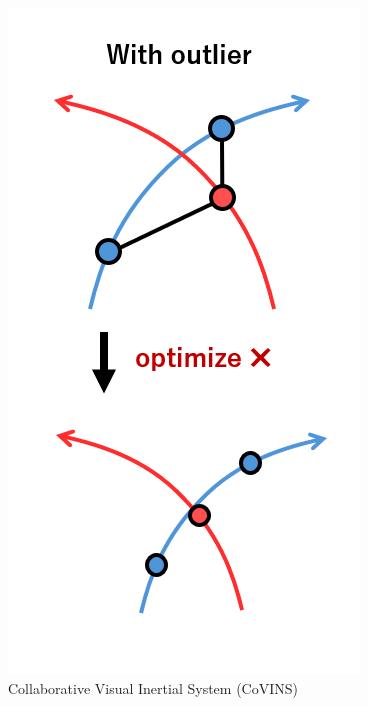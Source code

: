\documentclass[a4paper,fleqn,10pt,twocolumn]{SICE_ISCS}
\begin{document}
\begin{figure}[t]
	\begin{center}
		\includegraphics[width=\linewidth]{Fig/idea_image_middle.png}
		\caption{Collaborative Visual Inertial System (CoVINS)}
		\label{fig:covins}
	\end{center}
	\vspace{-2mm}
\end{figure}
\end{document}
